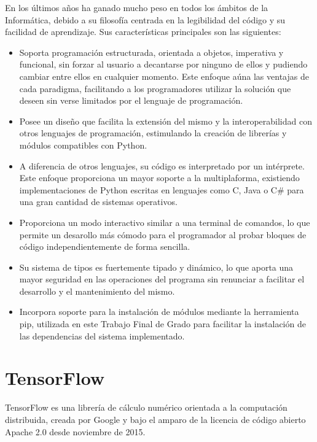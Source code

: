 \documentclass[../main.tex]{subfiles}
\begin{document}
En los últimos años ha ganado mucho peso en todos los ámbitos de la Informática, debido a su filosofía centrada en la legibilidad del código y su facilidad de aprendizaje. Sus características principales son las siguientes:
\begin{itemize}
  \item Soporta programación estructurada, orientada a objetos, imperativa y funcional, sin forzar al usuario a decantarse por ninguno de ellos y pudiendo cambiar entre ellos en cualquier momento. Este enfoque aúna las ventajas de cada paradigma, facilitando a los programadores utilizar la solución que deseen sin verse limitados por el lenguaje de programación.
  \item Posee un diseño que facilita la extensión del mismo y la interoperabilidad con otros lenguajes de programación, estimulando la creación de librerías y módulos compatibles con Python.
  \item A diferencia de otros lenguajes, su código es interpretado por un intérprete. Este enfoque proporciona un mayor soporte a la multiplaforma, existiendo implementaciones de Python escritas en lenguajes como C, Java o C\# para una gran cantidad de sistemas operativos.
  \item Proporciona un modo interactivo similar a una terminal de comandos, lo que permite un desarollo más cómodo para el programador al probar bloques de código independientemente de forma sencilla.
  \item Su sistema de tipos es fuertemente tipado y dinámico, lo que aporta una mayor seguridad en las operaciones del programa sin renunciar a facilitar el desarrollo y el mantenimiento del mismo.
  \item Incorpora soporte para la instalación de módulos mediante la herramienta pip, utilizada en este Trabajo Final de Grado para facilitar la instalación de las dependencias del sistema implementado.
\end{itemize}

\section{TensorFlow}
TensorFlow es una librería de cálculo numérico orientada a la computación distribuida, creada por Google y bajo el amparo de la licencia de código abierto Apache 2.0 desde noviembre de 2015.\newline 
\end{document}
